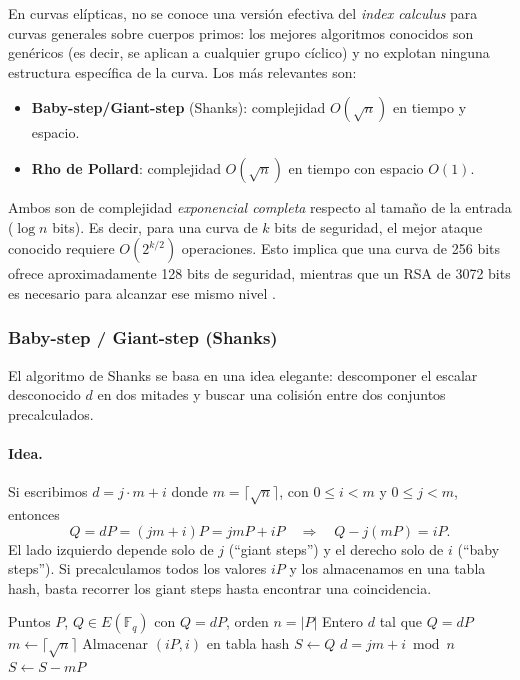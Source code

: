 En curvas elípticas, no se conoce una versión efectiva del \textit{index calculus} para curvas generales sobre cuerpos primos: los mejores algoritmos conocidos son genéricos (es decir, se aplican a cualquier grupo cíclico) y no explotan ninguna estructura específica de la curva. Los más relevantes son:
\begin{itemize}
    \item \textbf{Baby-step/Giant-step} (Shanks): complejidad $O(\sqrt{n})$ en tiempo y espacio.
    \item \textbf{Rho de Pollard}: complejidad $O(\sqrt{n})$ en tiempo con espacio $O(1)$.
\end{itemize}

Ambos son de complejidad \emph{exponencial completa} respecto al tamaño de la entrada ($\log n$ bits). Es decir, para una curva de $k$ bits de seguridad, el mejor ataque conocido requiere $O(2^{k/2})$ operaciones. Esto implica que una curva de 256 bits ofrece aproximadamente 128 bits de seguridad, mientras que un RSA de 3072 bits es necesario para alcanzar ese mismo nivel \cite{hankerson2004guide,nist-sp800-57}.

\subsubsection{Baby-step / Giant-step (Shanks)}
\label{subsubsec:bsgs}
 
El algoritmo de Shanks \cite{hankerson2004guide} se basa en una idea elegante: descomponer el escalar desconocido $d$ en dos mitades y buscar una colisi\'on entre dos conjuntos precalculados.
 
\paragraph{Idea.}
Si escribimos $d = j \cdot m + i$ donde $m = \lceil \sqrt{n} \rceil$, con $0 \leq i < m$ y $0 \leq j < m$, entonces
\[
    Q = dP = (jm + i)P = jmP + iP
    \quad\Longrightarrow\quad
    Q - j(mP) = iP.
\]
El lado izquierdo depende solo de $j$ (``giant steps'') y el derecho solo de $i$ (``baby steps''). Si precalculamos todos los valores $iP$ y los almacenamos en una tabla hash, basta recorrer los giant steps hasta encontrar una coincidencia.
 
\begin{algorithm}[htbp]
\caption{Baby-step / Giant-step para el ECDLP}
\label{alg:bsgs}
\begin{algorithmic}[1]
\Require Puntos $P$, $Q \in E(\mathbb{F}_q)$ con $Q = dP$, orden $n = |P|$
\Ensure Entero $d$ tal que $Q = dP$
\State $m \leftarrow \lceil \sqrt{n} \rceil$
\State {}
    \State Almacenar $(iP, i)$ en tabla hash
\EndFor
\State {}
\State $S \leftarrow Q$
        \State \Return $d = jm + i \bmod n$
    \EndIf
    \State $S \leftarrow S - mP$ 
\EndFor
\end{algorithmic}
\end{algorithm}
 
